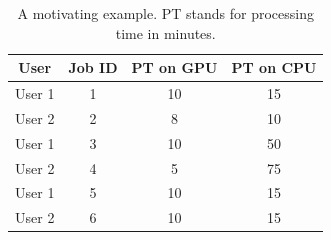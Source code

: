 
\begin{table}[t]
	\caption{A motivating example. PT stands for processing time in minutes. }\vspace{-0.1in}
	\label{tbl:mov_example}
	\begin{tabular}{|c|c|c|c|}
		\hline
		User & Job ID & PT on GPU & PT on CPU \\  \hline \hline
		User 1 & 1 & 10 & 15 \\  \hline
		User 2 & 2 & 8 & 10 \\  \hline
        User 1 & 3 & 10 & 50 \\  \hline
		User 2 & $  $4 & 5 & 75 \\  \hline
        User 1 & 5 & 10 & 15 \\  \hline		
		User 2 & 6 & 10 & 15 \\  \hline
	\end{tabular}\vspace{-0.2in}
\end{table}


